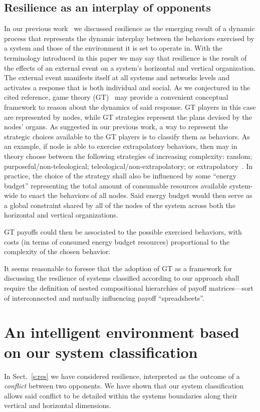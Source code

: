 \documentclass[twocolumn]{svjour3}
\def\P{\hbox{}}
\begin{document}
\subsection{Resilience as an interplay of opponents}
In our previous work~\cite{DF15b} we discussed resilience as
the emerging result of a dynamic process that represents the dynamic interplay between the behaviors
exercised by a system and those of the environment it is
set to operate in. With the terminology introduced in this paper we may say
that resilience is the result of the effects of an external event on a system's
horizontal and vertical organization. The external event manifests itself at all
systems and networks levels and activates a response that is both individual and
social. As we conjectured in the cited reference, game theory (GT)~\cite{EaKl10} may provide a convenient
conceptual framework to reason about the dynamics of said response.
GT players in this case are represented by nodes, while GT strategies represent the plans
devised by the nodes' \P{} organs. As suggested in our previous work,
a way to represent the strategic choices available to the GT players
is to classify them as behaviors.
As an example, if node  is able to
exercise extrapolatory behaviors, then  may in theory choose between the following strategies
of increasing complexity:
random; purposeful/non-teleological; teleological/non-extrapolatory; or extrapolatory~\cite{RWB43}.
In practice, the choice of the strategy shall also be influenced by some ``energy budget''
representing the total amount of consumable resources available system-wide to enact the behaviors of
all nodes. Said energy budget would then serve as a global constraint
shared by all of the nodes of the system across both the horizontal and vertical organizations.

GT payoffs could then be associated to the possible exercised behaviors, with costs (in terms
of consumed energy budget resources) proportional to the complexity of the chosen behavior.

It seems reasonable to foresee that the adoption of GT as a framework for discussing the
resilience of systems classified according to our approach
shall require the definition of nested compositional hierarchies of payoff matrices---sort
of interconnected and mutually influencing payoff ``spreadsheets''.




\section{An intelligent environment based on our system classification}\label{s:fso}
In Sect.~\ref{s:res} we have considered resilience, interpreted as the outcome of
a \emph{conflict\/} between two opponents. We have shown that our system classification
allows said conflict to be detailed within the systems boundaries along
their vertical and horizontal dimensions.
\end{document}
